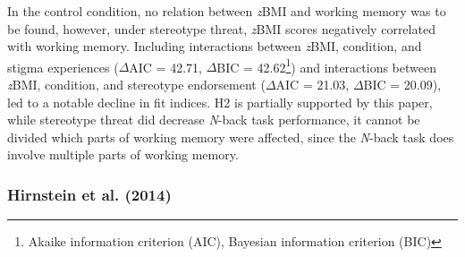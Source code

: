\documentclass[
  stu,floatsintext]{apa7}
\begin{document}
In the control condition, no relation between \emph{z}BMI and working memory was to be found, however, under stereotype threat, \emph{z}BMI scores negatively correlated with working memory.
Including interactions between \emph{z}BMI, condition, and stigma experiences (\(\Delta\)AIC = 42.71, \(\Delta\)BIC = 42.62\footnote{Akaike information criterion (AIC), Bayesian information criterion (BIC)}) and interactions between \emph{z}BMI, condition, and stereotype endorsement (\(\Delta\)AIC = 21.03, \(\Delta\)BIC = 20.09), led to a notable decline in fit indices.
H2 is partially supported by this paper, while stereotype threat did decrease \emph{N}-back task performance, it cannot be divided which parts of working memory were affected, since the \emph{N}-back task does involve multiple parts of working memory.

\subsubsection{Hirnstein et al. (2014)}\label{hirnsteingenderstereotypingcognitivesex2014}
\end{document}
